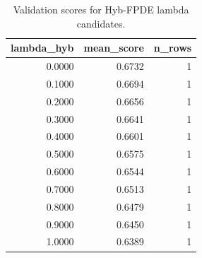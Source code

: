 \begin{table}[t]
\caption{Validation scores for Hyb-FPDE lambda candidates.}
\label{tab:lambda_distribution_computed}
\centering
\begin{tabular}{rrr}
\toprule
lambda\_hyb & mean\_score & n\_rows \\
\midrule
0.0000 & 0.6732 & 1 \\
0.1000 & 0.6694 & 1 \\
0.2000 & 0.6656 & 1 \\
0.3000 & 0.6641 & 1 \\
0.4000 & 0.6601 & 1 \\
0.5000 & 0.6575 & 1 \\
0.6000 & 0.6544 & 1 \\
0.7000 & 0.6513 & 1 \\
0.8000 & 0.6479 & 1 \\
0.9000 & 0.6450 & 1 \\
1.0000 & 0.6389 & 1 \\
\bottomrule
\end{tabular}

\end{table}
